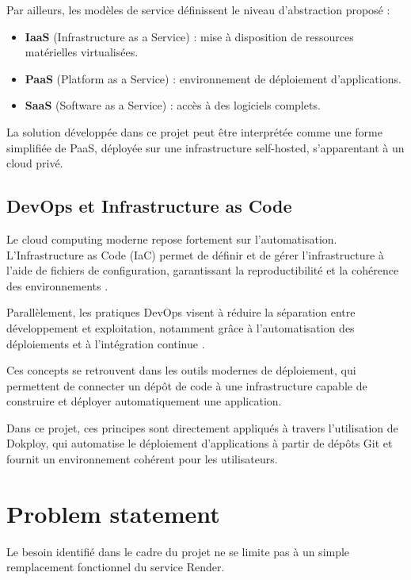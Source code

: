 \documentclass{rapportClass} %
\begin{document}
Par ailleurs, les modèles de service définissent le niveau
d’abstraction proposé \cite{NIST2026, ISO2026} :

\begin{itemize}[label=$\bullet$] 
\item \textbf{IaaS} (Infrastructure as a Service) : mise à disposition
de ressources matérielles virtualisées.
\item \textbf{PaaS} (Platform as a Service) : environnement de
déploiement d’applications.
\item \textbf{SaaS} (Software as a Service) : accès à des logiciels
complets.
\end{itemize}

La solution développée dans ce projet peut être interprétée comme une
forme simplifiée de PaaS, déployée sur une infrastructure
self-hosted, s’apparentant à un cloud privé.

\subsection{DevOps et Infrastructure as Code}

Le cloud computing moderne repose fortement sur l’automatisation.
L’Infrastructure as Code (IaC) permet de définir et de gérer
l’infrastructure à l’aide de fichiers de configuration, garantissant
la reproductibilité et la cohérence des environnements \cite{Morris2016}.

Parallèlement, les pratiques DevOps visent à réduire la séparation
entre développement et exploitation, notamment grâce à
l’automatisation des déploiements et à l’intégration continue
\cite{Bass2015}.

Ces concepts se retrouvent dans les outils modernes de déploiement,
qui permettent de connecter un dépôt de code à une infrastructure
capable de construire et déployer automatiquement une application.

Dans ce projet, ces principes sont directement appliqués à travers
l’utilisation de Dokploy, qui automatise le déploiement d’applications
à partir de dépôts Git et fournit un environnement cohérent pour les
utilisateurs.

\section{Problem statement}

Le besoin identifié dans le cadre du projet ne se limite pas à un
simple remplacement fonctionnel du service Render.
\end{document}
